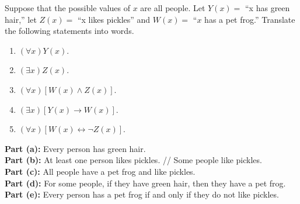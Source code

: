 \documentclass[11pt]{article}
\begin{document}
\pagebreak

\begin{homeworkProblem}
Suppose that the possible values of $x$ are all people. Let $Y (x) = $ “x has green hair,” let $Z(x)
= $ “x likes pickles” and $W (x) = $ “$x$ has a pet frog.” Translate the following statements into
words.

\begin{enumerate}[label=(\alph*), topsep=5pt, itemsep=5pt]
    \item $(\forall x) Y(x)$.
    \item $(\exists x) Z(x)$.
    \item $(\forall x)[W(x) \wedge Z(x)]$.
    \item $(\exists x)[Y(x) \rightarrow W(x)]$.
    \item $(\forall x)[W(x) \leftrightarrow \neg Z(x)]$.
\end{enumerate} \vspace{1\baselineskip}

\solution

\textbf{Part (a):} Every person has green hair. \\

\textbf{Part (b):} At least one person likes pickles. // Some people like pickles. \\

\textbf{Part (c):} All people have a pet frog and like pickles. \\
 
\textbf{Part (d):} For some people, if they have green hair, then they have a pet frog.  \\

\textbf{Part (e):} Every person has a pet frog if and only if they do not like pickles.

\end{homeworkProblem}
\end{document}

